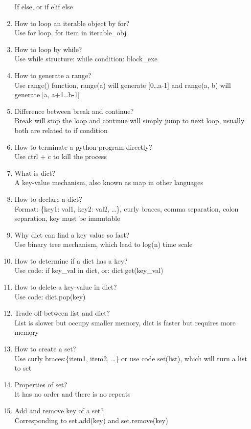 \documentclass[10pt,a4paper,oneside]{article}
\begin{document}
\begin{enumerate}
	If else, or if elif else
	\item How to loop an iterable object by for?\\
	Use for loop, for item in iterable\_obj
	\item How to loop by while?\\
	Use while structure: while condition: block\_exe
	\item How to generate a range?\\
	Use range() function, range(a) will generate [0\dots a-1] and range(a, b) will generate [a, a+1\dots b-1]
	\item Difference between break and continue?\\
	Break will stop the loop and continue will simply jump to next loop, usually both are related to if condition
	\item How to terminate a python program directly?\\
	Use ctrl + c to kill the process
	\item What is dict?\\
	A key-value mechanism, also known as map in other languages
	\item How to declare a dict?\\
	Format: \{key1: val1, key2: val2, \dots\}, curly braces, comma separation, colon separation, key must be immutable
	\item Why dict can find a key value so fast?\\
	Use binary tree mechanism, which lead to log(n) time scale
	\item How to determine if a dict has a key?\\
	Use code: if key\_val in dict, or: dict.get(key\_val)
	\item How to delete a key-value in dict?\\
	Use code: dict.pop(key)
	\item Trade off between list and dict?\\
	List is slower but occupy smaller memory, dict is faster but requires more memory
	\item How to create a set?\\
	Use curly braces:\{item1, item2, \dots\} or use code set(list), which will turn a list to set
	\item Properties of set?\\
	It has no order and there is no repeats
	\item Add and remove key of a set?\\
	Corresponding to set.add(key) and set.remove(key)

\end{enumerate}
\end{document}
